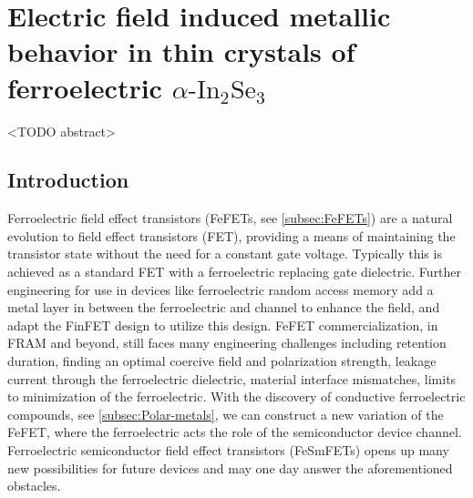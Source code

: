 
\chapter{Electric field induced metallic behavior in thin crystals of ferroelectric
$\ensuremath{\alpha}\textrm{-In}_{2}\textrm{Se}_{3}$\label{chapter:FeSm-FET}}

<TODO abstract>

\section{Introduction}

Ferroelectric field effect transistors (FeFETs, see \ref{subsec:FeFETs})
are a natural evolution to field effect transistors (FET), providing
a means of maintaining the transistor state without the need for a
constant gate voltage. Typically this is achieved as a standard FET
with a ferroelectric replacing gate dielectric.\citep{dunkel2017afefet,si2018ferroelectric}
Further engineering for use in devices like ferroelectric random access
memory add a metal layer in between the ferroelectric and channel
to enhance the field, and adapt the FinFET design to utilize this
design.\citep{khan2020future} FeFET commercialization, in FRAM and
beyond, still faces many engineering challenges including retention
duration, finding an optimal coercive field and polarization strength,
leakage current through the ferroelectric dielectric, material interface
mismatches, limits to minimization of the ferroelectric.\citep{ma2002why,khan2020future}
With the discovery of conductive ferroelectric compounds, see \ref{subsec:Polar-metals},
we can construct a new variation of the FeFET, where the ferroelectric
acts the role of the semiconductor device channel.\citep{si2018ferroelectric}
Ferroelectric semiconductor field effect transistors (FeSmFETs) opens
up many new possibilities for future devices and may one day answer
the aforementioned obstacles.

